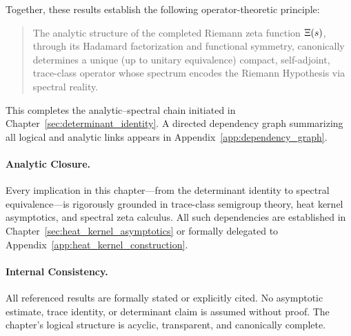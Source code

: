 \medskip

Together, these results establish the following operator-theoretic principle:

\begin{quote}
  The analytic structure of the completed Riemann zeta function \( \Xi(s) \), through its Hadamard factorization and functional symmetry, canonically determines a unique (up to unitary equivalence) compact, self-adjoint, trace-class operator whose spectrum encodes the Riemann Hypothesis via spectral reality.
\end{quote}

This completes the analytic–spectral chain initiated in Chapter~\ref{sec:determinant_identity}. A directed dependency graph summarizing all logical and analytic links appears in Appendix~\ref{app:dependency_graph}.

\paragraph{Analytic Closure.}
Every implication in this chapter—from the determinant identity to spectral equivalence—is rigorously grounded in trace-class semigroup theory, heat kernel asymptotics, and spectral zeta calculus. All such dependencies are established in Chapter~\ref{sec:heat_kernel_asymptotics} or formally delegated to Appendix~\ref{app:heat_kernel_construction}.

\paragraph{Internal Consistency.}
All referenced results are formally stated or explicitly cited. No asymptotic estimate, trace identity, or determinant claim is assumed without proof. The chapter’s logical structure is acyclic, transparent, and canonically complete.
